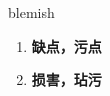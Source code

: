 
\begin{frame}
{\huge blemish}
\begin{center}
\begin{enumerate}\Large
  \item \textbf{缺点，污点}
  \item \textbf{损害，玷污}
\end{enumerate}
\end{center}
\end{frame}
